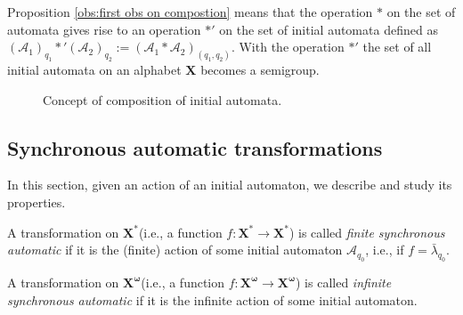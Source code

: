 \documentclass[mat1]{fmfdeloTS2.0}
\newcommand{\obs}{}				%
\newcommand{\word}{\mathbf}				%
\newcommand{\abece}{\mathbf{X}}			%
\newcommand{\fslovar}{\mathbf{X^*}}		%
\newcommand{\infslovar}{\mathbf{X^\omega}}		%
\newcommand{\auto}{\mathcal}			%
\newcommand{\LAMBDA}{\bar{\lambda}}			%
\begin{document}
\begin{remark}
Proposition \ref{obs:first obs on compostion} means that the operation $*$ on the set of \obs{automata} gives rise to an operation $*'$ on the set of \obs{initial automata} defined as $(\auto{A}_1)_{q_1}*'(\auto{A}_2)_{q_2}:=(\auto{A}_1*\auto{A}_2)_{(q_1,q_2)}$. With the operation $*'$ the set of all initial automata on an alphabet $\abece$ becomes a \obs{semigroup}.
\end{remark}

\begin{figure}[H]
\caption{Concept of composition of initial automata.}
\label{fig:composition of automata}
\end{figure}

\smallskip
\subsection{Synchronous automatic transformations}
In this section, given an action of an initial automaton, we describe and study its properties.

\begin{definition}
A transformation on $\fslovar$(i.e., a function $f:\fslovar\longrightarrow\fslovar$) is called \emph{finite synchronous automatic} if it is the (finite) action of some initial automaton $\auto{A}_{q_0}$, i.e., if $f=\LAMBDA_{q_0}$.
\end{definition}

\begin{definition}
A transformation on $\infslovar$(i.e., a function $f:\infslovar\longrightarrow\infslovar$) is called \emph{infinite synchronous automatic} if it is the infinite action of some initial automaton. 
\end{definition}
\end{document}

